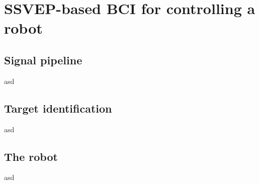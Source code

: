 
\chapter{SSVEP-based BCI for controlling a robot}
\label{sec:SSVEP_BCI}
\section{Signal pipeline}
asd
\section{Target identification}
asd
\section{The robot}
asd